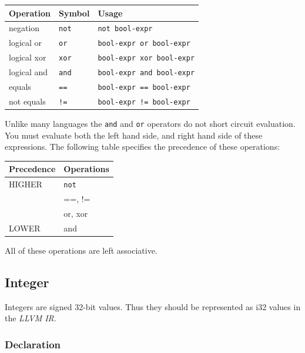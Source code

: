 \documentclass{article}
\begin{document}
		\begin{center}
			\begin{tabular}{|l|l|l|}
				\hline
				\textbf{Operation} & \textbf{Symbol} & \textbf{Usage} \\
				\hline
				negation    & \texttt{not} & \texttt{not bool-expr}           \\
				logical or  & \texttt{or}  & \texttt{bool-expr or bool-expr}  \\
				logical xor & \texttt{xor} & \texttt{bool-expr xor bool-expr} \\
				logical and & \texttt{and} & \texttt{bool-expr and bool-expr} \\
				equals      & \texttt{==}	 & \texttt{bool-expr == bool-expr}  \\
				not equals  & \texttt{!=}	 & \texttt{bool-expr != bool-expr}  \\
				\hline
			\end{tabular}
		\end{center}

		Unlike many languages the \texttt{and} and \texttt{or} operators do not short circuit evaluation. You must
		evaluate both the left hand side, and right hand side of these expressions. The following table specifies the
		precedence of these operations:

		\begin{center}
			\begin{tabular}{|l|l|}
				\hline
				\textbf{Precedence} & \textbf{Operations} \\
				\hline
				HIGHER & \texttt{not} \\
				       & ==, !=       \\
				       & or, xor      \\
				LOWER  & and          \\
				\hline
			\end{tabular}
		\end{center}

		All of these operations are left associative.


	\subsection{Integer}\label{sec:integer}

		Integers are signed 32-bit values. Thus they should be represented as i32 values in the \textit{LLVM IR}.

	\subsubsection{Declaration}
\end{document}
